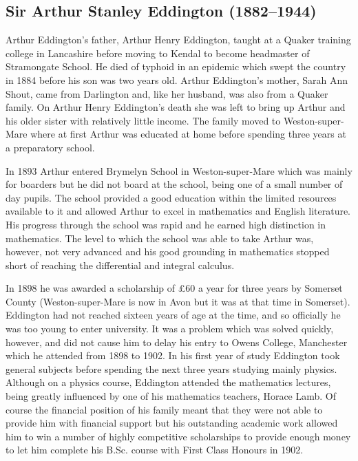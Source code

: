 \subsection[Sir Arthur \scshape{Eddington}]{Sir Arthur Stanley Eddington (1882--1944)}\label{bio:eddington}
Arthur Eddington's father, Arthur Henry Eddington, taught at a Quaker training college in Lancashire before moving to Kendal to become headmaster of Stramongate School. He died of typhoid in an epidemic which swept the country in 1884 before his son was two years old. Arthur Eddington's mother, Sarah Ann Shout, came from Darlington and, like her husband, was also from a Quaker family. On Arthur Henry Eddington's death she was left to bring up Arthur and his older sister with relatively little income. The family moved to Weston-super-Mare where at first Arthur was educated at home before spending three years at a preparatory school.

In 1893 Arthur entered Brymelyn School in Weston-super-Mare which was mainly for boarders but he did not board at the school, being one of a small number of day pupils. The school provided a good education within the limited resources available to it and allowed Arthur to excel in mathematics and English literature. His progress through the school was rapid and he earned high distinction in mathematics. The level to which the school was able to take Arthur was, however, not very advanced and his good grounding in mathematics stopped short of reaching the differential and integral calculus.

In 1898 he was awarded a scholarship of £60 a year for three years by Somerset County (Weston-super-Mare is now in Avon but it was at that time in Somerset). Eddington had not reached sixteen years of age at the time, and so officially he was too young to enter university. It was a problem which was solved quickly, however, and did not cause him to delay his entry to Owens College, Manchester which he attended from 1898 to 1902. In his first year of study Eddington took general subjects before spending the next three years studying mainly physics. Although on a physics course, Eddington attended the mathematics lectures, being greatly influenced by one of his mathematics teachers, Horace Lamb. Of course the financial position of his family meant that they were not able to provide him with financial support but his outstanding academic work allowed him to win a number of highly competitive scholarships to provide enough money to let him complete his B.Sc. course with First Class Honours in 1902.

